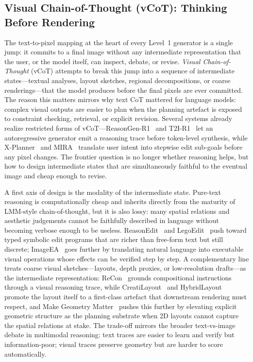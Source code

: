 \documentclass{llmxive}
\begin{document}
\subsection{Visual Chain-of-Thought (vCoT): Thinking Before Rendering}
\label{subsec:vcot}

The text-to-pixel mapping at the heart of every Level~1 generator is a single jump: it commits to a final image without any intermediate representation that the user, or the model itself, can inspect, debate, or revise. \emph{Visual Chain-of-Thought} (vCoT) attempts to break this jump into a sequence of intermediate states---textual analyses, layout sketches, regional decompositions, or coarse renderings---that the model produces before the final pixels are ever committed. The reason this matters mirrors why text CoT mattered for language models: complex visual outputs are easier to plan when the planning artefact is exposed to constraint checking, retrieval, or explicit revision. Several systems already realize restricted forms of vCoT---ReasonGen-R1~\citep{zhang2025reasongen} and T2I-R1~\citep{jiang2025t2i} let an autoregressive generator emit a reasoning trace before token-level synthesis, while X-Planner~\citep{Yeh2025BeyondSE} and MIRA~\citep{Zeng2025MIRAMI} translate user intent into stepwise edit sub-goals before any pixel changes. The frontier question is no longer whether reasoning helps, but how to design intermediate states that are simultaneously faithful to the eventual image and cheap enough to revise.

A first axis of design is the modality of the intermediate state. Pure-text reasoning is computationally cheap and inherits directly from the maturity of LMM-style chain-of-thought, but it is also lossy: many spatial relations and aesthetic judgements cannot be faithfully described in language without becoming verbose enough to be useless. ReasonEdit~\citep{Yin2025ReasonEditTR} and LegoEdit~\citep{Jia2025LegoEditAG} push toward typed symbolic edit programs that are richer than free-form text but still discrete; ImageEA~\citep{Hu2025ImageEA} goes further by translating natural language into executable visual operations whose effects can be verified step by step. A complementary line treats coarse visual sketches---layouts, depth proxies, or low-resolution drafts---as the intermediate representation: ReCon~\citep{ReCon} grounds compositional instructions through a visual reasoning trace, while CreatiLayout~\citep{CreatiLayout} and HybridLayout~\citep{wu2025hybrid} promote the layout itself to a first-class artefact that downstream rendering must respect, and Make Geometry Matter~\citep{zhang2026make} pushes this further by elevating explicit geometric structure as the planning substrate when 2D layouts cannot capture the spatial relations at stake. The trade-off mirrors the broader text-vs-image debate in multimodal reasoning: text traces are easier to learn and verify but information-poor; visual traces preserve geometry but are harder to score automatically.
\end{document}
